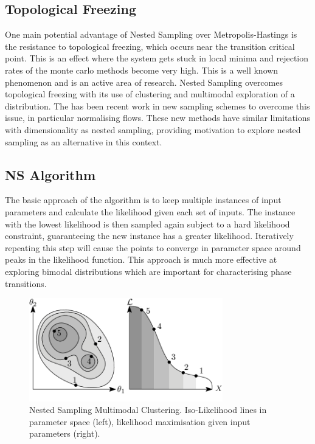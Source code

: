 \documentclass[a4paper]{article}
\begin{document}
      
    \subsection{Topological Freezing}
    One main potential advantage of Nested Sampling over Metropolis-Hastings is the resistance to
    topological freezing, which occurs near the transition critical
    point. This is an
    effect where the system gets stuck in local minima and rejection
    rates of the monte carlo methods become very high. This is a well known
    phenomenon and is an active area of research.\cite{4} Nested
    Sampling overcomes topological freezing with its use of clustering
    and multimodal exploration of a distribution. The has been recent
    work in new sampling schemes to overcome this issue, in particular
    normalising flows\cite{5}. These new methods have similar
    limitations with dimensionality as nested sampling, providing
    motivation to explore nested sampling as an alternative in this context.

    \subsection{NS Algorithm}
    The basic approach of the algorithm is to keep multiple instances
    of input parameters and calculate the likelihood given each set of
    inputs. The instance with the lowest likelihood is then sampled
    again subject to a hard likelihood constraint, guaranteeing the
    new instance has a greater likelihood. Iteratively repeating this
    step will cause the points to converge in parameter space around
    peaks in the likelihood function. This approach is much more
    effective at exploring bimodal distributions which are important
    for characterising phase transitions.
    
\begin{figure}[H]
\centering
\includegraphics[width=0.75\textwidth]{ns}
\caption{Nested Sampling Multimodal Clustering. Iso-Likelihood lines in
  parameter space (left), likelihood maximisation given input
  parameters (right).}
\end{figure}
\end{document}
